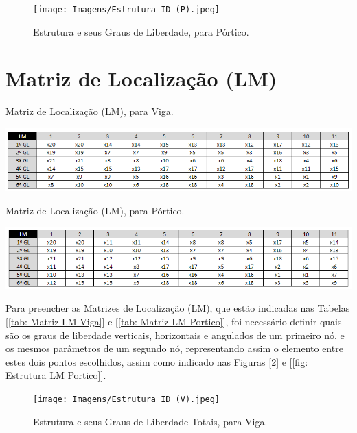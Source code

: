 \documentclass[deposito, acronym, symbols]{fei}
\begin{document}
\begin{figure}[!htb]
 \centering
    \caption{Estrutura e seus Graus de Liberdade, para Pórtico.}
    \texttt{[image: Imagens/Estrutura ID (P).jpeg]}
    \label{fig: Estrutura ID Portico}
 \end{figure}

\section{Matriz de Localização (LM)}

\begin{table}[!htb]
 \centering
    \caption{Matriz de Localização (LM), para Viga.}
    \includegraphics[width=1\linewidth]{Tabelas/12Matriz de Localização (V).png}
    \label{tab: Matriz LM Viga}
 \end{table}

\begin{table}[!htb]
 \centering
    \caption{Matriz de Localização (LM), para Pórtico.}
    \includegraphics[width=1\linewidth]{Tabelas/13Matriz de Localização (P).png}
    \label{tab: Matriz LM Portico}
 \end{table}
 
Para preencher as Matrizes de Localização (LM), que estão indicadas nas Tabelas [\ref{tab: Matriz LM Viga}] e [\ref{tab: Matriz LM Portico}], foi necessário definir quais são os graus de liberdade verticais, horizontais e angulados de um primeiro nó, e os mesmos parâmetros de um segundo nó, representando assim o elemento entre estes dois pontos escolhidos, assim como indicado nas Figuras [\ref{fig: Estrutura LM Viga}] e [\ref{fig: Estrutura LM Portico}].

\begin{figure}[!htb]
 \centering
    \caption{Estrutura e seus Graus de Liberdade Totais, para Viga.}
    \texttt{[image: Imagens/Estrutura ID (V).jpeg]}
    \label{fig: Estrutura LM Viga}
 \end{figure}
\end{document}
